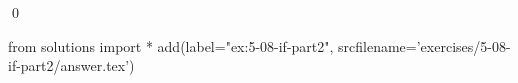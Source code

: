 
\begin{ex}
  \label{ex:5-08-if-part2}
  
  \qed
\end{ex}
\begin{python0}
from solutions import *
add(label="ex:5-08-if-part2",
    srcfilename='exercises/5-08-if-part2/answer.tex')
\end{python0}
